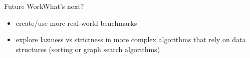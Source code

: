 

    \begin{frame}{Future Work}{What's next?}

        \begin{itemize}

            \item create/use more real-world benchmarks
            \item explore laziness vs strictness in more complex algorithms that rely on data structures (sorting or graph search algorithms)


        \end{itemize}


    \end{frame}






